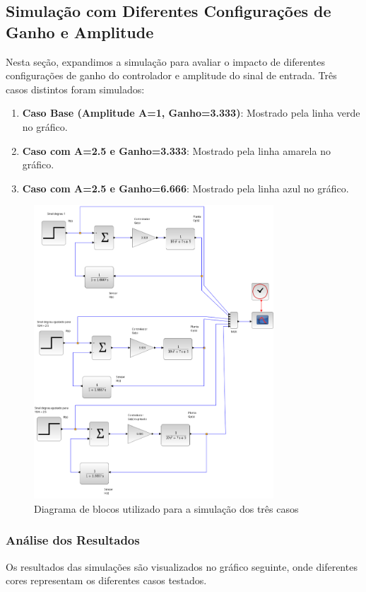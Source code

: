 \subsection{Simulação com Diferentes Configurações de Ganho e Amplitude}
Nesta seção, expandimos a simulação para avaliar o impacto de diferentes configurações de ganho do controlador e amplitude do sinal de entrada. Três casos distintos foram simulados:


\begin{enumerate}
    \item \textbf{Caso Base (Amplitude A=1, Ganho=3.333)}: Mostrado pela linha verde no gráfico.
    \item \textbf{Caso com A=2.5 e Ganho=3.333}: Mostrado pela linha amarela no gráfico.
    \item \textbf{Caso com A=2.5 e Ganho=6.666}: Mostrado pela linha azul no gráfico.
\end{enumerate}

\begin{figure}[H]
    \centering
    \includegraphics[width=0.8\textwidth]{atividades/5-atividade/assets/diagrama-c.png}
    \caption{Diagrama de blocos utilizado para a simulação dos três casos}
    \label{fig:diagrama_blocos_c}
\end{figure}

\subsubsection{Análise dos Resultados}
Os resultados das simulações são visualizados no gráfico seguinte, onde diferentes cores representam os diferentes casos testados.



